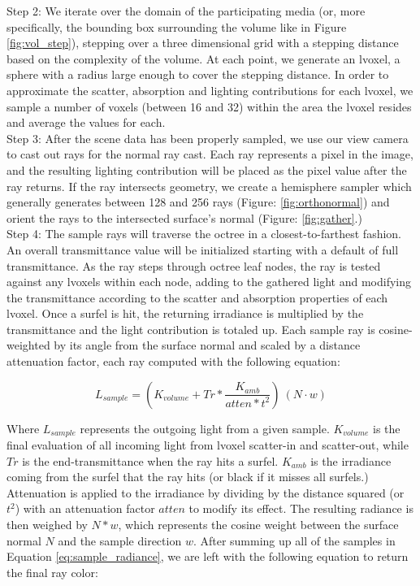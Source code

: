 \documentclass[12pt]{ucthesis}
\begin{document}
Step 2:  We iterate over the domain of the participating media (or, more specifically, the bounding box surrounding the volume like in Figure \ref{fig:vol_step}), stepping over a three dimensional grid with a stepping distance based on the complexity of the volume.  At each point, we generate an lvoxel, a sphere with a radius large enough to cover the stepping distance.  In order to approximate the scatter, absorption and lighting contributions for each lvoxel, we sample a number of voxels (between 16 and 32) within the area the lvoxel resides and average the values for each.\\

Step 3:  After the scene data has been properly sampled, we use our view camera to cast out rays for the normal ray cast.  Each ray represents a pixel in the image, and the resulting lighting contribution will be placed as the pixel value after the ray returns.  If the ray intersects geometry, we create a hemisphere sampler which generally generates between 128 and 256 rays (Figure: \ref{fig:orthonormal}) and orient the rays to the intersected surface's normal (Figure: \ref{fig:gather}.)\\

Step 4:  The sample rays will traverse the octree in a closest-to-farthest fashion.  An overall transmittance value will be initialized starting with a default of full transmittance.  As the ray steps through octree leaf nodes, the ray is tested against any lvoxels within each node, adding to the gathered light and modifying the transmittance according to the scatter and absorption properties of each lvoxel.  Once a surfel is hit, the returning irradiance is multiplied by the transmittance and the light contribution is totaled up. Each sample ray is cosine-weighted by its angle from the surface normal and scaled by a distance attenuation factor, each ray computed with the following equation:

\begin{equation}
    L_{sample} = (K_{volume} + Tr * \frac{K_{amb}}{atten * t ^ 2})\:(N \cdot w) %
    \label{eq:sample_radiance}
\end{equation}


Where $L_{sample}$ represents the outgoing light from a given sample. $K_{volume}$ is the final evaluation of all incoming light from lvoxel scatter-in and scatter-out, while $Tr$ is the end-transmittance when the ray hits a surfel.  $K_{amb}$ is the irradiance coming from the surfel that the ray hits (or black if it misses all surfels.)  Attenuation is applied to the irradiance by dividing by the distance squared (or $t^2$) with an attenuation factor $atten$ to modify its effect.  The resulting radiance is then weighed by $N * w$, which represents the cosine weight between the surface normal $N$ and the sample direction $w$.  After summing up all of the samples in Equation \ref{eq:sample_radiance}, we are left with the following equation to return the final ray color:
\end{document}
